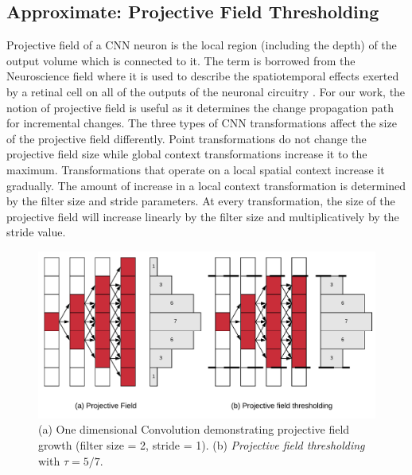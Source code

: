 \subsection{Approximate: Projective Field Thresholding}

Projective field \cite{le2017receptive, basiccnnoperations} of a CNN neuron is the local region (including the depth) of the output volume which is connected to it.
The term is borrowed from the Neuroscience field where it is used to describe the spatiotemporal effects exerted by a retinal cell on all of the outputs of the neuronal circuitry \cite{de2011projective}.
For our work, the notion of projective field is useful as it determines the change propagation path for incremental changes.
The three types of CNN transformations affect the size of the projective field differently.
Point transformations do not change the projective field size while global context transformations increase it to the maximum.
Transformations that operate on a local spatial context increase it gradually.
The amount of increase in a local context transformation is determined by the filter size and stride parameters.
At every transformation, the size of the projective field will increase linearly by the filter size and multiplicatively by the stride value.

\begin{figure}[t]
\includegraphics[width=\columnwidth]{images/pf_truncate}
\caption{(a) One dimensional Convolution demonstrating projective field growth (filter size = 2, stride = 1). (b) \textit{Projective field thresholding} with $\tau = 5/7$.}
\label{fig:pf_truncate}
\end{figure}

